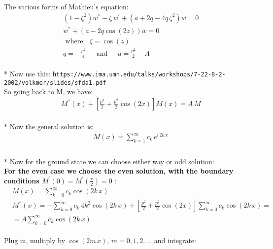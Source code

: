 \documentclass[11pt, oneside]{article}   	%
\begin{document}
The various forms of Mathieu's equation:
\begin{equation}
\begin{split}
& (1 - \zeta^2)w^{''} - \zeta\,w^{'} + (a + 2q - 4q\,\zeta^2)w = 0 \\[.8em]
& w^{''} +\left( a - 2q\cos (2z)\right)w = 0 \\[.8em]
& \text{ where: }\,\,\zeta = \cos(z)  \\[.8em]
& q = -\frac{p^2}{4}\,\,\,\,\,\,\,\text{ and  }\,\,\,\,\,\,\,a= \frac{p^2}{2} - A
\end{split}
\end{equation}\\*
Now use this: \verb+https://www.ima.umn.edu/talks/workshops/7-22-8-2-2002/volkmer/slides/sfda1.pdf+ \\[.8em]
So going back to M, we have:
\begin{equation}
\begin{split}
& M^{''}(x) + \left[ \frac{p^2}{2} + \frac{p^2}{2}\cos (2 x)\right]M(x) = A\,M
\end{split}
\end{equation}\\*
Now the general solution is:
\begin{equation}
\begin{split}
& M(x) = \sum_{k=1}^{\infty}{c_k\,e^{i\,2 k\,x}}  \\[.8em]
\end{split}
\end{equation}\\*
Now for the ground state we can choose either way or odd solution:\\[1.5em]
\textbf{For the even case we choose the even solution, with the boundary conditions $ M^{'}(0) = M^{'}\left(\frac{\pi}{2}\right) = 0 $} :
\begin{equation}
\begin{split}
& M(x) = \sum_{k=0}^{\infty}{c_k\cos(2 k\,x)}  \\[.8em]
& M^{''}(x) = -  \sum_{k=0}^{\infty}{c_k\,4 k^2\cos(2 k\,x)}  +   \left[ \frac{p^2}{2} + \frac{p^2}{2}\cos (2 x)\right]\sum_{k=0}^{\infty}{c_k\cos(2 k\,x)}  = \\[.8em] 
& = A \sum_{k=0}^{\infty}{c_k\cos(2 k\,x)} 
\end{split}
\end{equation}\\[1em]
Plug in, multiply by $ \cos(2m\,x) $, $ m = 0,1,2,... $ and integrate: 
\end{document}
